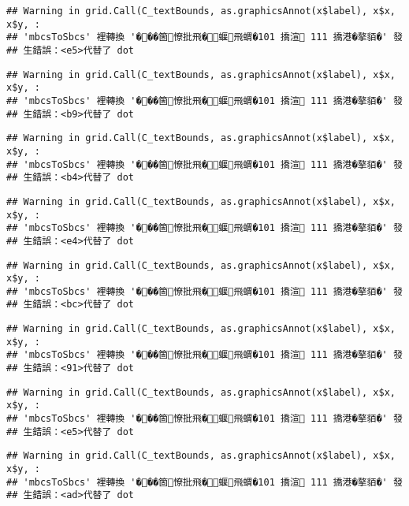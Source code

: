 \documentclass[
]{article}
\begin{document}
\begin{verbatim}
## Warning in grid.Call(C_textBounds, as.graphicsAnnot(x$label), x$x, x$y, :
## 'mbcsToSbcs' 裡轉換 '���箇憭批飛�蝘飛蝟�101 撟渲 111 撟港�摮貊�' 發
## 生錯誤：<e5>代替了 dot
\end{verbatim}

\begin{verbatim}
## Warning in grid.Call(C_textBounds, as.graphicsAnnot(x$label), x$x, x$y, :
## 'mbcsToSbcs' 裡轉換 '���箇憭批飛�蝘飛蝟�101 撟渲 111 撟港�摮貊�' 發
## 生錯誤：<b9>代替了 dot
\end{verbatim}

\begin{verbatim}
## Warning in grid.Call(C_textBounds, as.graphicsAnnot(x$label), x$x, x$y, :
## 'mbcsToSbcs' 裡轉換 '���箇憭批飛�蝘飛蝟�101 撟渲 111 撟港�摮貊�' 發
## 生錯誤：<b4>代替了 dot
\end{verbatim}

\begin{verbatim}
## Warning in grid.Call(C_textBounds, as.graphicsAnnot(x$label), x$x, x$y, :
## 'mbcsToSbcs' 裡轉換 '���箇憭批飛�蝘飛蝟�101 撟渲 111 撟港�摮貊�' 發
## 生錯誤：<e4>代替了 dot
\end{verbatim}

\begin{verbatim}
## Warning in grid.Call(C_textBounds, as.graphicsAnnot(x$label), x$x, x$y, :
## 'mbcsToSbcs' 裡轉換 '���箇憭批飛�蝘飛蝟�101 撟渲 111 撟港�摮貊�' 發
## 生錯誤：<bc>代替了 dot
\end{verbatim}

\begin{verbatim}
## Warning in grid.Call(C_textBounds, as.graphicsAnnot(x$label), x$x, x$y, :
## 'mbcsToSbcs' 裡轉換 '���箇憭批飛�蝘飛蝟�101 撟渲 111 撟港�摮貊�' 發
## 生錯誤：<91>代替了 dot
\end{verbatim}

\begin{verbatim}
## Warning in grid.Call(C_textBounds, as.graphicsAnnot(x$label), x$x, x$y, :
## 'mbcsToSbcs' 裡轉換 '���箇憭批飛�蝘飛蝟�101 撟渲 111 撟港�摮貊�' 發
## 生錯誤：<e5>代替了 dot
\end{verbatim}

\begin{verbatim}
## Warning in grid.Call(C_textBounds, as.graphicsAnnot(x$label), x$x, x$y, :
## 'mbcsToSbcs' 裡轉換 '���箇憭批飛�蝘飛蝟�101 撟渲 111 撟港�摮貊�' 發
## 生錯誤：<ad>代替了 dot
\end{verbatim}
\end{document}
